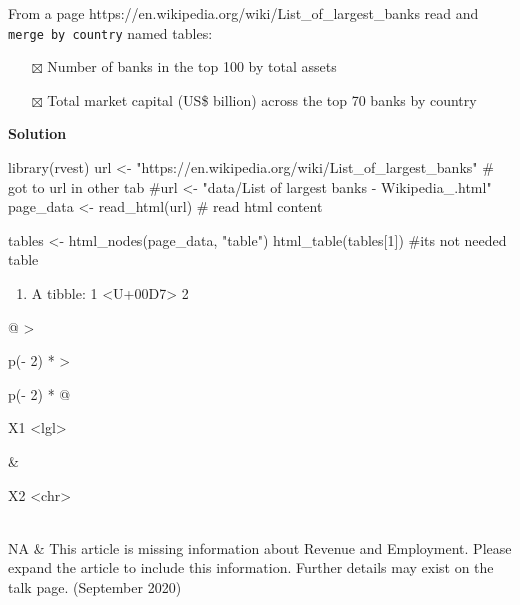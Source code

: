 \documentclass[
  letterpaper,
  DIV=11,
  numbers=noendperiod]{scrreprt}
\newenvironment{Shaded}{\begin{snugshade}}{\end{snugshade}}
\newcommand{\CommentTok}[1]{\textcolor[rgb]{0.37,0.37,0.37}{#1}}
\newcommand{\DecValTok}[1]{\textcolor[rgb]{0.68,0.00,0.00}{#1}}
\newcommand{\FunctionTok}[1]{\textcolor[rgb]{0.28,0.35,0.67}{#1}}
\newcommand{\NormalTok}[1]{\textcolor[rgb]{0.00,0.23,0.31}{#1}}
\newcommand{\OtherTok}[1]{\textcolor[rgb]{0.00,0.23,0.31}{#1}}
\newcommand{\StringTok}[1]{\textcolor[rgb]{0.13,0.47,0.30}{#1}}
\providecommand{\tightlist}{%
  \setlength{\itemsep}{0pt}\setlength{\parskip}{0pt}}\usepackage{longtable,booktabs,array}
\begin{document}
From a page https://en.wikipedia.org/wiki/List\_of\_largest\_banks read
and \texttt{merge\ by\ country} named tables:

\begin{itemize}
\tightlist
\item[$\boxtimes$]
  Number of banks in the top 100 by total assets
\item[$\boxtimes$]
  Total market capital (US\$ billion) across the top 70 banks by country
\end{itemize}

\textbf{Solution}

\begin{Shaded}
\begin{Highlighting}[]
\FunctionTok{library}\NormalTok{(rvest)}
\NormalTok{url }\OtherTok{\textless{}{-}} \StringTok{"https://en.wikipedia.org/wiki/List\_of\_largest\_banks"} \CommentTok{\# got to url in other tab}
\CommentTok{\#url \textless{}{-} "data/List of largest banks {-} Wikipedia\_.html"}
\NormalTok{page\_data }\OtherTok{\textless{}{-}} \FunctionTok{read\_html}\NormalTok{(url) }\CommentTok{\# read html content}

\NormalTok{tables }\OtherTok{\textless{}{-}} \FunctionTok{html\_nodes}\NormalTok{(page\_data, }\StringTok{"table"}\NormalTok{)}
\FunctionTok{html\_table}\NormalTok{(tables[}\DecValTok{1}\NormalTok{]) }\CommentTok{\#its not needed table}
\end{Highlighting}
\end{Shaded}

\begin{enumerate}
\def\labelenumi{\arabic{enumi}.}
\tightlist
\item
  A tibble: 1 \textless U+00D7\textgreater{} 2
\end{enumerate}

\begin{longtable}[]{@{}
  >{\raggedright\arraybackslash}p{(\columnwidth - 2\tabcolsep) * }
  >{\raggedright\arraybackslash}p{(\columnwidth - 2\tabcolsep) * }@{}}
\toprule\noalign{}
\begin{minipage}[b]{\linewidth}\raggedright
X1 \textless lgl\textgreater{}
\end{minipage} & \begin{minipage}[b]{\linewidth}\raggedright
X2 \textless chr\textgreater{}
\end{minipage} \\
\midrule\noalign{}
\endhead
\bottomrule\noalign{}
\endlastfoot
NA & This article is missing information about Revenue and Employment.
Please expand the article to include this information. Further details
may exist on the talk page. (September 2020) \\
\end{longtable}
\end{document}
